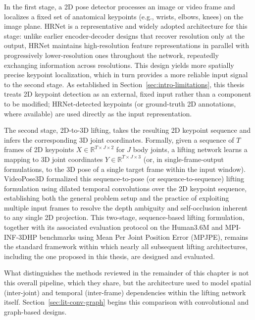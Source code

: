 In the first stage, a 2D pose detector processes an image or video frame
and localizes a fixed set of anatomical keypoints (e.g., wrists, elbows,
knees) on the image plane. HRNet \cite{sun2019hrnet} is a representative
and widely adopted architecture for this stage: unlike earlier
encoder-decoder designs that recover resolution only at the output,
HRNet maintains high-resolution feature representations in parallel with
progressively lower-resolution ones throughout the network, repeatedly
exchanging information across resolutions. This design yields more
spatially precise keypoint localization, which in turn provides a more
reliable input signal to the second stage. As established in
Section~\ref{sec:intro-limitations}, this thesis treats 2D keypoint
detection as an external, fixed input rather than a component to be
modified; HRNet-detected keypoints (or ground-truth 2D annotations, where
available) are used directly as the input representation.

The second stage, 2D-to-3D lifting, takes the resulting 2D keypoint
sequence and infers the corresponding 3D joint coordinates. Formally,
given a sequence of $T$ frames of 2D keypoints $X \in
\mathbb{R}^{T \times J \times 2}$ for $J$ body joints, a lifting network
learns a mapping to 3D joint coordinates $Y \in \mathbb{R}^{T \times J
\times 3}$ (or, in single-frame-output formulations, to the 3D pose of a
single target frame within the input window). VideoPose3D
\cite{pavllo2019videopose3d} formalized this sequence-to-pose (or
sequence-to-sequence) lifting formulation using dilated temporal
convolutions over the 2D keypoint sequence, establishing both the general
problem setup and the practice of exploiting multiple input frames to
resolve the depth ambiguity and self-occlusion inherent to any single 2D
projection. This two-stage, sequence-based lifting formulation, together
with its associated evaluation protocol on the Human3.6M
\cite{ionescu2014human36m} and MPI-INF-3DHP \cite{mehta2017mpiinf3dhp}
benchmarks using Mean Per Joint Position Error (MPJPE), remains the
standard framework within which nearly all subsequent lifting
architectures, including the one proposed in this thesis, are designed and
evaluated.

What distinguishes the methods reviewed in the remainder of this chapter
is not this overall pipeline, which they share, but the architecture used
to model spatial (inter-joint) and temporal (inter-frame) dependencies
within the lifting network itself. Section~\ref{sec:lit-conv-graph}
begins this comparison with convolutional and graph-based designs.

